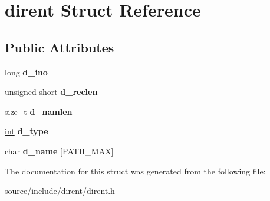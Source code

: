 \hypertarget{structdirent}{}\section{dirent Struct Reference}
\label{structdirent}
\subsection*{Public Attributes}
\begin{DoxyCompactItemize}
\item 
\hypertarget{structdirent_acb6fecfb0e0f6fdc226dff8d56c3da4a}{}long {\bfseries d\+\_\+ino}\label{structdirent_acb6fecfb0e0f6fdc226dff8d56c3da4a}

\item 
\hypertarget{structdirent_a90dc47836e8ef510437317876368859e}{}unsigned short {\bfseries d\+\_\+reclen}\label{structdirent_a90dc47836e8ef510437317876368859e}

\item 
\hypertarget{structdirent_a09ced068b03cdb339e34840c8b709621}{}size\+\_\+t {\bfseries d\+\_\+namlen}\label{structdirent_a09ced068b03cdb339e34840c8b709621}

\item 
\hypertarget{structdirent_ad6a736cb04c7295e8f97f708324b3500}{}\hyperlink{_s_d_l__thread_8h_a6a64f9be4433e4de6e2f2f548cf3c08e}{int} {\bfseries d\+\_\+type}\label{structdirent_ad6a736cb04c7295e8f97f708324b3500}

\item 
\hypertarget{structdirent_a6c68ac080755453ec52de202e91de59b}{}char {\bfseries d\+\_\+name} \mbox{[}P\+A\+T\+H\+\_\+\+M\+A\+X\mbox{]}\label{structdirent_a6c68ac080755453ec52de202e91de59b}

\end{DoxyCompactItemize}


The documentation for this struct was generated from the following file\+:\begin{DoxyCompactItemize}
\item 
source/include/dirent/dirent.\+h\end{DoxyCompactItemize}
